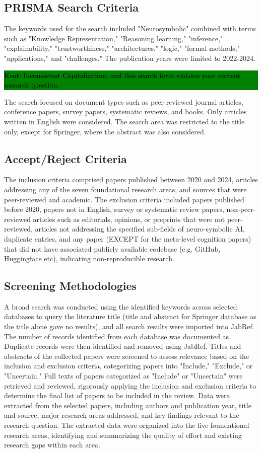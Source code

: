 \documentclass[hf]{ceurart}
\newcommand{\pinaforecomment}[4]{\colorbox{#1}{\textcolor{#4}{\parbox{.8\linewidth}{#2: #3}}}}
\newcommand{\osullikomment}[1]{\pinaforecomment{green}{Kent}{#1}{black}}
\begin{document}
\subsection{PRISMA Search Criteria}

The keywords used for the search included "Neurosymbolic" combined with terms such as "Knowledge Representation," "Reasoning learning," "inference," "explainability," "trustworthiness," "architectures," "logic," "formal methods," "applications," and "challenges." The publication years were limited to 2022-2024. 
%
\osullikomment{Inconsistent Capitalization, and this search term violates your current research question.}
%
The search focused on document types such as peer-reviewed journal articles, conference papers, survey papers, systematic reviews, and books. Only articles written in English were considered. The search area was restricted to the title only, except for Springer, where the abstract was also considered.

\subsection{Accept/Reject Criteria}

The inclusion criteria comprised papers published between 2020 and 2024, articles addressing any of the seven foundational research areas, and sources that were peer-reviewed and academic. The exclusion criteria included papers published before 2020, papers not in English, survey or systematic review papers, non-peer-reviewed articles such as editorials, opinions, or preprints that were not peer-reviewed, articles not addressing the specified sub-fields of neuro-symbolic AI, duplicate entries, and any paper (EXCEPT for the meta-level cognition papers) that did not have associated publicly available codebase (e.g. GitHub, Huggingface etc), indicating non-reproducible research. 

\subsection{Screening Methodologies}
A broad search was conducted using the identified keywords across selected databases to query the literature title (title and abstract for Springer database as the title alone gave no results), and all search results were imported into JabRef. The number of records identified from each database was documented as. Duplicate records were then identified and removed using JabRef. Titles and abstracts of the collected papers were screened to assess relevance based on the inclusion and exclusion criteria, categorizing papers into "Include," "Exclude," or "Uncertain." Full texts of papers categorized as "Include" or "Uncertain" were retrieved and reviewed, rigorously applying the inclusion and exclusion criteria to determine the final list of papers to be included in the review. Data were extracted from the selected papers, including authors and publication year, title and source, major research areas addressed, and key findings relevant to the research question. The extracted data were organized into the five foundational research areas, identifying and summarizing the quality of effort and existing research gaps within each area.
\end{document}
